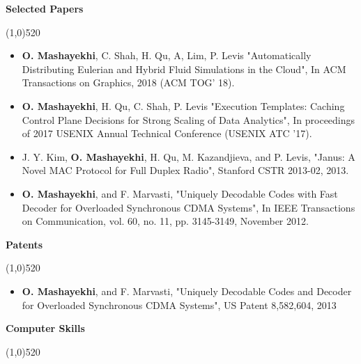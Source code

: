 \documentclass[letterpaper,10pt]{article}
\newcommand{\heading}[1] {
  {\large
    \begin{minipage}
    {\textwidth}
    {\textbf{#1}}
    \end{minipage}
  }
  \begin{center}
  \vspace{-15pt}
  \line(1,0){520}
  \end{center}
}
\begin{document}
\heading{Selected Papers}

\begin{itemize}[noitemsep,topsep=0pt, leftmargin=.5cm, rightmargin=.5cm]

\item[]
\textbf{O. Mashayekhi}, C. Shah, H. Qu, A, Lim, P. Levis
"Automatically Distributing Eulerian and Hybrid Fluid Simulations in the Cloud",
In ACM Transactions on Graphics, 2018 (ACM TOG' 18).

\vspace{5pt}

\item[]
\textbf{O. Mashayekhi}, H. Qu, C. Shah, P. Levis
"Execution Templates: Caching Control Plane Decisions for Strong Scaling of Data Analytics",
In proceedings of 2017 USENIX Annual Technical Conference (USENIX ATC '17).

\vspace{5pt}

\item[]
J. Y. Kim, \textbf{O. Mashayekhi}, H. Qu, M. Kazandjieva, and P. Levis,
"Janus: A Novel MAC Protocol for Full Duplex Radio",
Stanford CSTR 2013-02, 2013.

\vspace{5pt}

\item[]
\textbf{O. Mashayekhi}, and F. Marvasti,
"Uniquely Decodable Codes with Fast Decoder for Overloaded Synchronous CDMA Systems",
In IEEE Transactions on Communication, vol. 60, no. 11, pp. 3145-3149, November 2012.

\end{itemize}

\vspace{5pt}





\heading{Patents}

\begin{itemize}[noitemsep,topsep=0pt, leftmargin=.5cm, rightmargin=.5cm]
\item[]
\textbf{O. Mashayekhi}, and F. Marvasti,
"Uniquely Decodable Codes and Decoder for Overloaded Synchronous CDMA Systems",
US Patent 8,582,604, 2013
\end{itemize}

\vspace{5pt}





\heading{Computer Skills}
\end{document}
